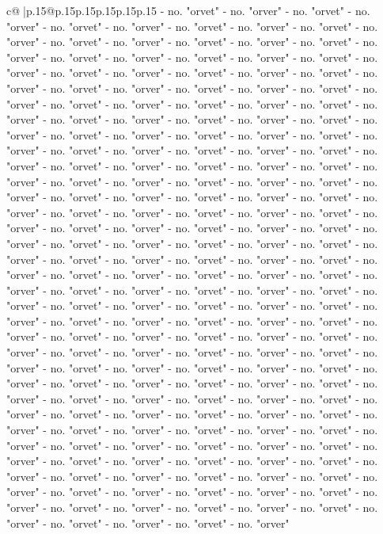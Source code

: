\documentclass{article}
\begin{document}
{\begin{supertabular}{c@{$\;$}|p{.15\linewidth}@{}p{.15\linewidth}p{.15\linewidth}p{.15\linewidth}p{.15\linewidth}p{.15\linewidth}}
{{{{-} no. "orvet" {-} no. "orver" {-} no. "orvet" {-} no. "orver" {-} no. "orvet" {-} no. "orver" {-} no. "orvet" {-} no. "orver" {-} no. "orvet" {-} no. "orver" {-} no. "orvet" {-} no. "orver" {-} no. "orvet" {-} no. "orver" {-} no. "orvet" {-} no. "orver" {-} no. "orvet" {-} no. "orver" {-} no. "orvet" {-} no. "orver" {-} no. "orvet" {-} no. "orver" {-} no. "orvet" {-} no. "orver" {-} no. "orvet" {-} no. "orver" {-} no. "orvet" {-} no. "orver" {-} no. "orvet" {-} no. "orver" {-} no. "orvet" {-} no. "orver" {-} no. "orvet" {-} no. "orver" {-} no. "orvet" {-} no. "orver" {-} no. "orvet" {-} no. "orver" {-} no. "orvet" {-} no. "orver" {-} no. "orvet" {-} no. "orver" {-} no. "orvet" {-} no. "orver" {-} no. "orvet" {-} no. "orver" {-} no. "orvet" {-} no. "orver" {-} no. "orvet" {-} no. "orver" {-} no. "orvet" {-} no. "orver" {-} no. "orvet" {-} no. "orver" {-} no. "orvet" {-} no. "orver" {-} no. "orvet" {-} no. "orver" {-} no. "orvet" {-} no. "orver" {-} no. "orvet" {-} no. "orver" {-} no. "orvet" {-} no. "orver" {-} no. "orvet" {-} no. "orver" {-} no. "orvet" {-} no. "orver" {-} no. "orvet" {-} no. "orver" {-} no. "orvet" {-} no. "orver" {-} no. "orvet" {-} no. "orver" {-} no. "orvet" {-} no. "orver" {-} no. "orvet" {-} no. "orver" {-} no. "orvet" {-} no. "orver" {-} no. "orvet" {-} no. "orver" {-} no. "orvet" {-} no. "orver" {-} no. "orvet" {-} no. "orver" {-} no. "orvet" {-} no. "orver" {-} no. "orvet" {-} no. "orver" {-} no. "orvet" {-} no. "orver" {-} no. "orvet" {-} no. "orver" {-} no. "orvet" {-} no. "orver" {-} no. "orvet" {-} no. "orver" {-} no. "orvet" {-} no. "orver" {-} no. "orvet" {-} no. "orver" {-} no. "orvet" {-} no. "orver" {-} no. "orvet" {-} no. "orver" {-} no. "orvet" {-} no. "orver" {-} no. "orvet" {-} no. "orver" {-} no. "orvet" {-} no. "orver" {-} no. "orvet" {-} no. "orver" {-} no. "orvet" {-} no. "orver" {-} no. "orvet" {-} no. "orver" {-} no. "orvet" {-} no. "orver" {-} no. "orvet" {-} no. "orver" {-} no. "orvet" {-} no. "orver" {-} no. "orvet" {-} no. "orver" {-} no. "orvet" {-} no. "orver" {-} no. "orvet" {-} no. "orver" {-} no. "orvet" {-} no. "orver" {-} no. "orvet" {-} no. "orver" {-} no. "orvet" {-} no. "orver" {-} no. "orvet" {-} no. "orver" {-} no. "orvet" {-} no. "orver" {-} no. "orvet" {-} no. "orver" {-} no. "orvet" {-} no. "orver" {-} no. "orvet" {-} no. "orver" {-} no. "orvet" {-} no. "orver" {-} no. "orvet" {-} no. "orver" {-} no. "orvet" {-} no. "orver" {-} no. "orvet" {-} no. "orver" {-} no. "orvet" {-} no. "orver" {-} no. "orvet" {-} no. "orver" {-} no. "orvet" {-} no. "orver" {-} no. "orvet" {-} no. "orver" {-} no. "orvet" {-} no. "orver" {-} no. "orvet" {-} no. "orver" {-} no. "orvet" {-} no. "orver" {-} no. "orvet" {-} no. "orver" {-} no. "orvet" {-} no. "orver" {-} no. "orvet" {-} no. "orver" {-} no. "orvet" {-} no. "orver" {-} no. "orvet" {-} no. "orver" {-} no. "orvet" {-} no. "orver" {-} no. "orvet" {-} no. "orver" {-} no. "orvet" {-} no. "orver" {-} no. "orvet" {-} no. "orver" {-} no. "orvet" {-} no. "orver" {-} no. "orvet" {-} no. "orver" {-} no. "orvet" {-} no. "orver" {-} no. "orvet" {-} no. "orver" {-} no. "orvet" {-} no. "orver" {-} no. "orvet" {-} no. "orver" {-} no. "orvet" {-} no. "orver" }}}
\end{supertabular}}
\end{document}
